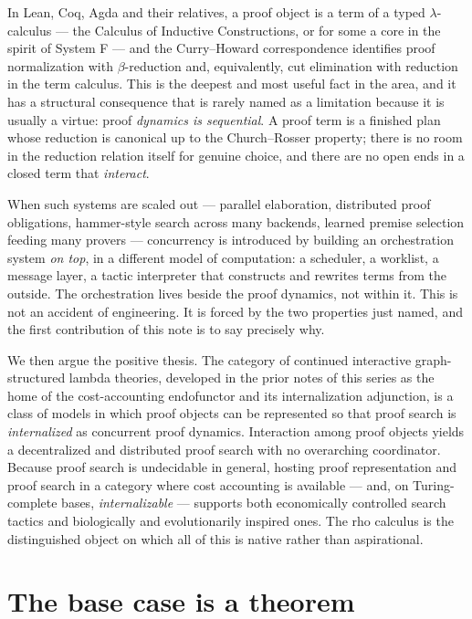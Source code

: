 \documentclass[11pt]{article}
\theoremstyle{plain}
\theoremstyle{definition}
\theoremstyle{remark}
\begin{document}
In Lean, Coq, Agda and their relatives, a proof object is a term of a typed
$\lambda$-calculus --- the Calculus of Inductive Constructions, or for some a
core in the spirit of System F --- and the Curry--Howard correspondence
identifies proof normalization with $\beta$-reduction and, equivalently, cut
elimination with reduction in the term calculus. This is the deepest and most
useful fact in the area, and it has a structural consequence that is rarely
named as a limitation because it is usually a virtue: proof \emph{dynamics is
sequential}. A proof term is a finished plan whose reduction is canonical up to
the Church--Rosser property; there is no room in the reduction relation itself
for genuine choice, and there are no open ends in a closed term that
\emph{interact}.

When such systems are scaled out --- parallel elaboration, distributed proof
obligations, hammer-style search across many backends, learned premise
selection feeding many provers --- concurrency is introduced by building an
orchestration system \emph{on top}, in a different model of computation: a
scheduler, a worklist, a message layer, a tactic interpreter that constructs
and rewrites terms from the outside. The orchestration lives beside the proof
dynamics, not within it. This is not an accident of engineering. It is forced
by the two properties just named, and the first contribution of this note is to
say precisely why.

We then argue the positive thesis. The category of continued interactive
graph-structured lambda theories, developed in the prior notes of this series
as the home of the cost-accounting endofunctor and its internalization
adjunction, is a class of models in which proof objects can be represented so
that proof search is \emph{internalized} as concurrent proof dynamics.
Interaction among proof objects yields a decentralized and distributed proof
search with no overarching coordinator. Because proof search is undecidable in
general, hosting proof representation and proof search in a category where cost
accounting is available --- and, on Turing-complete bases, \emph{internalizable}
--- supports both economically controlled search tactics and biologically and
evolutionarily inspired ones. The rho calculus is the distinguished object on
which all of this is native rather than aspirational.

\section{The base case is a theorem}
\end{document}
